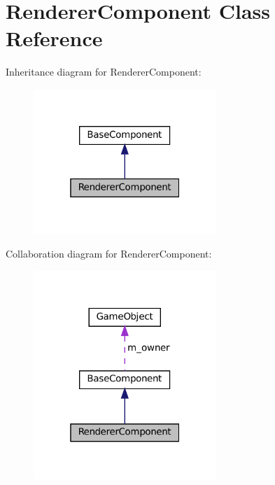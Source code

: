 \hypertarget{classRendererComponent}{}\section{Renderer\+Component Class Reference}
\label{classRendererComponent}


Inheritance diagram for Renderer\+Component\+:\nopagebreak
\begin{figure}[H]
\begin{center}
\leavevmode
\includegraphics[width=196pt]{classRendererComponent__inherit__graph}
\end{center}
\end{figure}


Collaboration diagram for Renderer\+Component\+:\nopagebreak
\begin{figure}[H]
\begin{center}
\leavevmode
\includegraphics[width=196pt]{classRendererComponent__coll__graph}
\end{center}
\end{figure}
